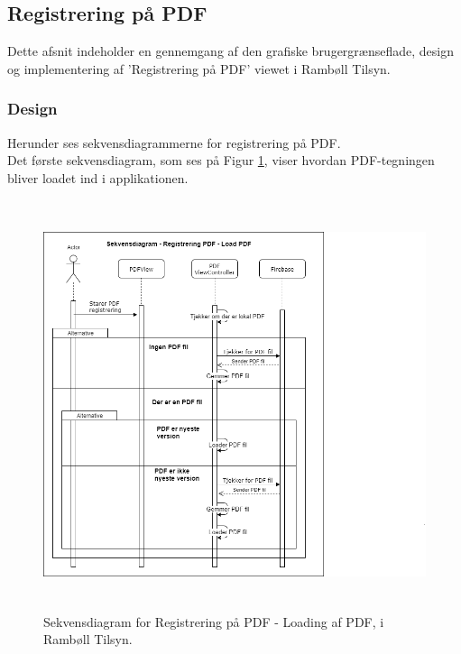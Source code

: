 \subsection{Registrering på PDF}\label{sec:PDF}
Dette afsnit indeholder en gennemgang af den grafiske brugergrænseflade, design og implementering af 'Registrering på PDF' viewet i Rambøll Tilsyn.

\subsubsection{Design}
Herunder ses sekvensdiagrammerne for registrering på PDF. \\
Det første sekvensdiagram, som ses på Figur \ref{fig:LoadPDFSekvensDiagram}, viser hvordan PDF-tegningen bliver loadet ind i applikationen.
\begin{figure}[H] %
	\centering
	\includegraphics[height=12cm, width=15cm]{../ArkitekturDesign/Design/RegisterPDF/LoadPDFSekvensDiagram}
	\caption{Sekvensdiagram for Registrering på PDF - Loading af PDF, i Rambøll Tilsyn.}
	\label{fig:LoadPDFSekvensDiagram}
\end{figure}

\clearpage

